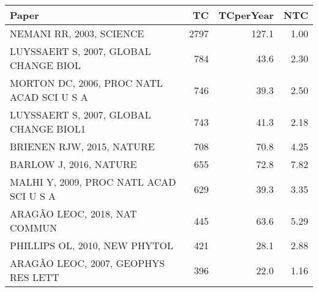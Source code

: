 
\begin{tabular}{lrrr}
\toprule
Paper & TC & TCperYear & NTC\\
\midrule
NEMANI RR, 2003, SCIENCE & 2797 & 127.1 & 1.00\\
LUYSSAERT S, 2007, GLOBAL CHANGE BIOL & 784 & 43.6 & 2.30\\
MORTON DC, 2006, PROC NATL ACAD SCI U S A & 746 & 39.3 & 2.50\\
LUYSSAERT S, 2007, GLOBAL CHANGE BIOL1 & 743 & 41.3 & 2.18\\
BRIENEN RJW, 2015, NATURE & 708 & 70.8 & 4.25\\
\addlinespace
BARLOW J, 2016, NATURE & 655 & 72.8 & 7.82\\
MALHI Y, 2009, PROC NATL ACAD SCI U S A & 629 & 39.3 & 3.35\\
ARAGÃO LEOC, 2018, NAT COMMUN & 445 & 63.6 & 5.29\\
PHILLIPS OL, 2010, NEW PHYTOL & 421 & 28.1 & 2.88\\
ARAGÃO LEOC, 2007, GEOPHYS RES LETT & 396 & 22.0 & 1.16\\
\bottomrule
\end{tabular}
